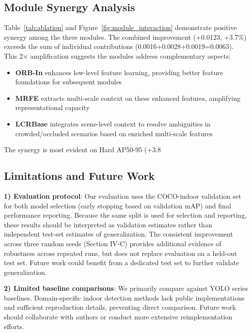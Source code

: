 \documentclass[journal]{IEEEtran}
\begin{document}
\subsection{Module Synergy Analysis}

Table~\ref{tab:ablation} and Figure~\ref{fig:module_interaction} demonstrate positive synergy among the three modules. The combined improvement (+0.0123, +3.7\%) exceeds the sum of individual contributions (0.0016+0.0028+0.0019=0.0063). This 2× amplification suggests the modules address complementary aspects:

\begin{itemize}
    \item \textbf{ORB-In} enhances low-level feature learning, providing better feature foundations for subsequent modules
    \item \textbf{MRFE} extracts multi-scale context on these enhanced features, amplifying representational capacity
    \item \textbf{LCRBase} integrates scene-level context to resolve ambiguities in crowded/occluded scenarios based on enriched multi-scale features
\end{itemize}

The synergy is most evident on Hard AP50-95 (+3.8%

\subsection{Limitations and Future Work}

\textbf{1) Evaluation protocol}: Our evaluation uses the COCO-indoor validation set for both model selection (early stopping based on validation mAP) and final performance reporting. Because the same split is used for selection and reporting, these results should be interpreted as validation estimates rather than independent test-set estimates of generalization. The consistent improvement across three random seeds (Section IV-C) provides additional evidence of robustness across repeated runs, but does not replace evaluation on a held-out test set. Future work could benefit from a dedicated test set to further validate generalization.

\textbf{2) Limited baseline comparisons}: We primarily compare against YOLO series baselines. Domain-specific indoor detection methods \cite{chen2020enhanced,zhang2021indoor} lack public implementations and sufficient reproduction details, preventing direct comparison. Future work should collaborate with authors or conduct more extensive reimplementation efforts.
\end{document}
